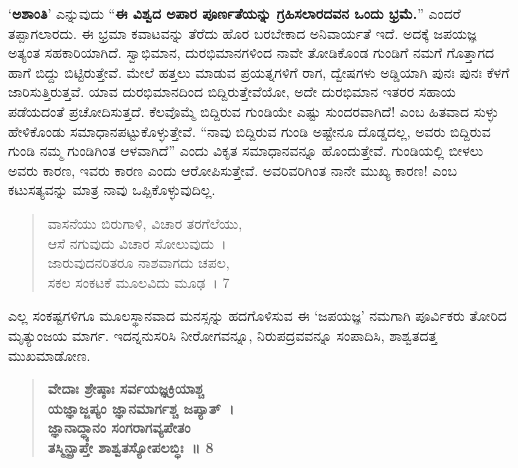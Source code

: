 {‘\textbf{ಅಶಾಂತಿ}’ ಎನ್ನುವುದು “\textbf{ಈ ವಿಶ್ವದ ಅಪಾರ ಪೂರ್ಣತೆಯನ್ನು ಗ್ರಹಿಸಲಾರದವನ ಒಂದು ಭ್ರಮೆ.}” ಎಂದರೆ ತಪ್ಪಾಗಲಾರದು. ಈ ಭ್ರಮಾ ಕವಾಟವನ್ನು ತೆರೆದು ಹೊರ ಬರಬೇಕಾದ ಅನಿವಾರ್ಯತೆ ಇದೆ. ಅದಕ್ಕೆ ಜಪಯಜ್ಞ ಅತ್ಯಂತ ಸಹಕಾರಿಯಾಗಿದೆ. ಸ್ವಾಭಿಮಾನ, ದುರಭಿಮಾನಗಳಿಂದ ನಾವೇ ತೋಡಿಕೊಂಡ ಗುಂಡಿಗೆ ನಮಗೆ ಗೊತ್ತಾಗದ ಹಾಗೆ ಬಿದ್ದು ಬಿಟ್ಟಿರುತ್ತೇವೆ. ಮೇಲೆ ಹತ್ತಲು ಮಾಡುವ ಪ್ರಯತ್ನಗಳಿಗೆ ರಾಗ, ದ್ವೇಷಗಳು ಅಡ್ಡಿಯಾಗಿ ಪುನಃ ಪುನಃ ಕೆಳಗೆ ಜಾರಿಸುತ್ತಿರುತ್ತವೆ. ಯಾವ ದುರಭಿಮಾನದಿಂದ ಬಿದ್ದಿರುತ್ತೇವೆಯೋ, ಅದೇ ದುರಭಿಮಾನ ಇತರರ ಸಹಾಯ ಪಡೆಯದಂತೆ ಪ್ರಚೋದಿಸುತ್ತದೆ. ಕೆಲವೊಮ್ಮೆ ಬಿದ್ದಿರುವ ಗುಂಡಿಯೇ ಎಷ್ಟು ಸುಂದರವಾಗಿದೆ! ಎಂಬ ಹಿತವಾದ ಸುಳ್ಳು ಹೇಳಿಕೊಂಡು ಸಮಾಧಾನಪಟ್ಟುಕೊಳ್ಳುತ್ತೇವೆ. “ನಾವು ಬಿದ್ದಿರುವ ಗುಂಡಿ ಅಷ್ಟೇನೂ ದೊಡ್ಡದಲ್ಲ, ಅವರು ಬಿದ್ದಿರುವ ಗುಂಡಿ ನಮ್ಮ ಗುಂಡಿಗಿಂತ ಆಳವಾಗಿದೆ” ಎಂದು ವಿಕೃತ ಸಮಾಧಾನವನ್ನೂ ಹೊಂದುತ್ತೇವೆ. ಗುಂಡಿಯಲ್ಲಿ ಬೀಳಲು ಅವರು ಕಾರಣ, ಇವರು ಕಾರಣ ಎಂದು ಆರೋಪಿಸುತ್ತೇವೆ. ಅವರಿವರಿಗಿಂತ ನಾನೇ ಮುಖ್ಯ ಕಾರಣ! ಎಂಬ ಕಟುಸತ್ಯವನ್ನು ಮಾತ್ರ ನಾವು ಒಪ್ಪಿಕೊಳ್ಳುವುದಿಲ್ಲ.

\begin{verse}
ವಾಸನೆಯು ಬಿರುಗಾಳಿ, ವಿಚಾರ ತರಗೆಲೆಯು, \\ಆಸೆ ನಗುವುದು ವಿಚಾರ ಸೋಲುವುದು~। \\
ಜಾರುವುದನರಿತರೂ ನಾಶವಾಗದು ಚಪಲ, \\ಸಕಲ ಸಂಕಟಕೆ ಮೂಲವಿದು ಮೂಢ~। 7
\end{verse}
ಎಲ್ಲ ಸಂಕಷ್ಟಗಳಿಗೂ ಮೂಲಸ್ಥಾನವಾದ ಮನಸ್ಸನ್ನು ಹದಗೊಳಿಸುವ ಈ ‘ಜಪಯಜ್ಞ’ ನಮಗಾಗಿ ಪೂರ್ವಿಕರು ತೋರಿದ ಮೃತ್ಯುಂಜಯ ಮಾರ್ಗ. ಇದನ್ನನುಸರಿಸಿ ನೀರೋಗ\-ವನ್ನೂ, ನಿರುಪದ್ರವವನ್ನೂ ಸಂಪಾದಿಸಿ, ಶಾಶ್ವತದತ್ತ ಮುಖಮಾಡೋಣ.
\begin{verse}	
\textbf{ವೇದಾಃ ಶ್ರೇಷ್ಠಾಃ ಸರ್ವಯಜ್ಞಕ್ರಿಯಾಶ್ಚ \\ಯಜ್ಞಾಜ್ಜಪ್ಯಂ ಜ್ಞಾನಮಾರ್ಗಶ್ಚ ಜಪ್ಯಾತ್~। \\
ಜ್ಞಾನಾದ್ಧ್ಯಾನಂ ಸಂಗರಾಗವ್ಯಪೇತಂ \\ತಸ್ಮಿನ್ಪ್ರಾಪ್ತೇ ಶಾಶ್ವತಸ್ಯೋಪಲಬ್ಧಿಃ~॥ 8}
\end{verse}	

\articleend
}
